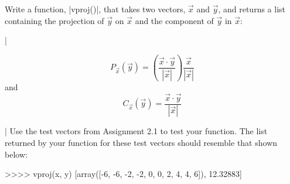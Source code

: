 \begin{assignment}
Write a function, |vproj()|, that takes two vectors, $\vec{x}$ and $\vec{y}$, and returns a list containing the projection of $\vec{y}$ on $\vec{x}$ and the component of $\vec{y}$ in $\vec{x}$:

\lstDeleteShortInline|

\[P_{\vec{x}}(\vec{y}) = \left(\frac{\vec{x} \cdot \vec{y}}{|\vec{x}|}\right) \frac{\vec{x}}{|\vec{x}|}\]
and
\[C_{\vec{x}}(\vec{y}) = \frac{\vec{x} \cdot \vec{y}}{|\vec{x}|}\]

\lstMakeShortInline|
Use the test vectors from Assignment 2.1 to test your function.  The list returned by your function for these test vectors should resemble that shown below:
%
\begin{python}
>>>> vproj(x, y)
[array([-6, -6, -2, -2, 0, 0, 2, 4, 4, 6]), 12.32883] 
\end{python}
\end{assignment}

